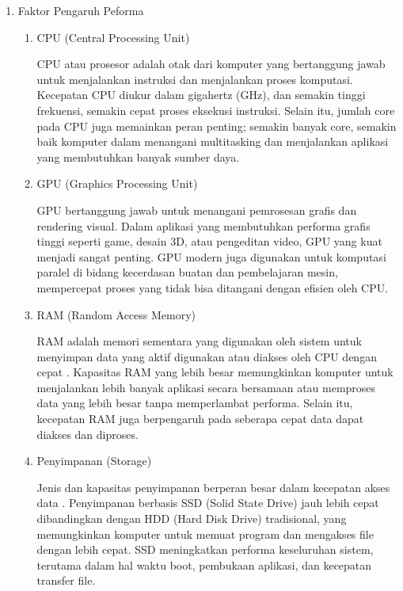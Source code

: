 \documentclass[12pt]{article}
\begin{document}
\begin{enumerate}
    \item {Faktor Pengaruh Peforma}
    \par \begin{enumerate}
        \item {CPU (Central Processing Unit)}
        \par \par CPU atau prosesor adalah otak dari komputer yang bertanggung jawab untuk menjalankan instruksi dan menjalankan proses komputasi. Kecepatan CPU diukur dalam gigahertz (GHz), dan semakin tinggi frekuensi, semakin cepat proses eksekusi instruksi. Selain itu, jumlah core pada CPU juga memainkan peran penting; semakin banyak core, semakin baik komputer dalam menangani multitasking dan menjalankan aplikasi yang membutuhkan banyak sumber daya.
        \item {GPU (Graphics Processing Unit)}
        \par GPU bertanggung jawab untuk menangani pemrosesan grafis dan rendering visual. Dalam aplikasi yang membutuhkan performa grafis tinggi seperti game, desain 3D, atau pengeditan video, GPU yang kuat menjadi sangat penting. GPU modern juga digunakan untuk komputasi paralel di bidang kecerdasan buatan dan pembelajaran mesin, mempercepat proses yang tidak bisa ditangani dengan efisien oleh CPU.
        
        \item {RAM (Random Access Memory)}
        \par RAM adalah memori sementara yang digunakan oleh sistem untuk menyimpan data yang aktif digunakan atau diakses oleh CPU dengan cepat . Kapasitas RAM yang lebih besar memungkinkan komputer untuk menjalankan lebih banyak aplikasi secara bersamaan atau memproses data yang lebih besar tanpa memperlambat performa. Selain itu, kecepatan RAM juga berpengaruh pada seberapa cepat data dapat diakses dan diproses.

        \item {Penyimpanan (Storage)}
        \par Jenis dan kapasitas penyimpanan berperan besar dalam kecepatan akses data . Penyimpanan berbasis SSD (Solid State Drive) jauh lebih cepat dibandingkan dengan HDD (Hard Disk Drive) tradisional, yang memungkinkan komputer untuk memuat program dan mengakses file dengan lebih cepat. SSD meningkatkan performa keseluruhan sistem, terutama dalam hal waktu boot, pembukaan aplikasi, dan kecepatan transfer file.


\end{enumerate}
\end{enumerate}
\end{document}
